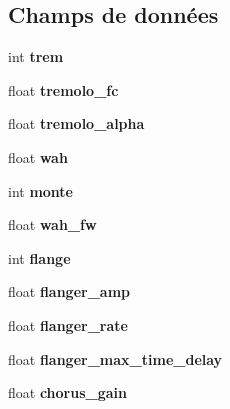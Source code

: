 \subsection*{Champs de données}
\begin{DoxyCompactItemize}
\item 
int {\bfseries trem}\hypertarget{structData_ab9d88ed9917ede02fe64d299cd7ee33e}{}\label{structData_ab9d88ed9917ede02fe64d299cd7ee33e}

\item 
float {\bfseries tremolo\+\_\+fc}\hypertarget{structData_a2f42f61ad1e519f4bd15d88c0b63a184}{}\label{structData_a2f42f61ad1e519f4bd15d88c0b63a184}

\item 
float {\bfseries tremolo\+\_\+alpha}\hypertarget{structData_a1e7d83c00e768ba6194921bf1a22766a}{}\label{structData_a1e7d83c00e768ba6194921bf1a22766a}

\item 
float {\bfseries wah}\hypertarget{structData_a53265f6c12c21b95ad5f0828d9b748aa}{}\label{structData_a53265f6c12c21b95ad5f0828d9b748aa}

\item 
int {\bfseries monte}\hypertarget{structData_af76c45e6e5edf309fa906d77b0fa4f41}{}\label{structData_af76c45e6e5edf309fa906d77b0fa4f41}

\item 
float {\bfseries wah\+\_\+fw}\hypertarget{structData_a5755f20c0c466ee6f8c2ef48234b83ba}{}\label{structData_a5755f20c0c466ee6f8c2ef48234b83ba}

\item 
int {\bfseries flange}\hypertarget{structData_ad088a0bb2b8fd8ef01c6e4a889004e35}{}\label{structData_ad088a0bb2b8fd8ef01c6e4a889004e35}

\item 
float {\bfseries flanger\+\_\+amp}\hypertarget{structData_a8e7e0d39e13b4ac2aaf93da0f8c9b859}{}\label{structData_a8e7e0d39e13b4ac2aaf93da0f8c9b859}

\item 
float {\bfseries flanger\+\_\+rate}\hypertarget{structData_a0b7b5cc28a48c53dd7cf79b39dd6d235}{}\label{structData_a0b7b5cc28a48c53dd7cf79b39dd6d235}

\item 
float {\bfseries flanger\+\_\+max\+\_\+time\+\_\+delay}\hypertarget{structData_ac2a7f5d469a9335a2b37fcbcef00650d}{}\label{structData_ac2a7f5d469a9335a2b37fcbcef00650d}

\item 
float {\bfseries chorus\+\_\+gain}\hypertarget{structData_a7ce19a1d32cc162a4599227142abac6b}{}\label{structData_a7ce19a1d32cc162a4599227142abac6b}


\end{DoxyCompactItemize}
